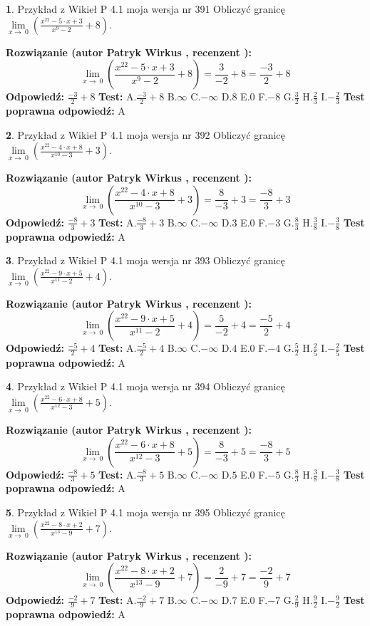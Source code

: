 \documentclass[12pt, a4paper]{article}
\theoremstyle{definition} %
\newtheorem{zad}{}
\newcommand{\zadStart}[1]{\begin{zad}#1\newline}
\newcommand{\zadStop}{\end{zad}}
\newcommand{\rozwStart}[2]{\noindent \textbf{Rozwiązanie (autor #1 , recenzent #2): }\newline}
\newcommand{\rozwStop}{\newline}
\newcommand{\odpStart}{\noindent \textbf{Odpowiedź:}\newline}
\newcommand{\odpStop}{\newline}
\newcommand{\testStart}{\noindent \textbf{Test:}\newline}
\newcommand{\testStop}{\newline}
\newcommand{\kluczStart}{\noindent \textbf{Test poprawna odpowiedź:}\newline}
\newcommand{\kluczStop}{\newline}
\begin{document}
\zadStart{Przykład z Wikieł P 4.1 moja wersja nr 391}
Obliczyć granicę $\lim\limits_{x\to\ 0}(\frac{x^{22}-5 \cdot x +3}{x^{9}-2}+8)$.
\zadStop
\rozwStart{Patryk Wirkus}{}
$$\lim\limits_{x\to\ 0}(\frac{x^{22}-5 \cdot x +3}{x^{9}-2}+8)=\frac{3}{-2}+8=\frac{-3}{2}+8$$
\rozwStop
\odpStart
$\frac{-3}{2}+8$
\odpStop
\testStart
A.$\frac{-3}{2}+8$
B.$\infty$
C.$-\infty$
D.$8$
E.$0$
F.$-8$
G.$\frac{3}{2}$
H.$\frac{2}{3}$
I.$-\frac{2}{3}$
\testStop
\kluczStart
A
\kluczStop



\zadStart{Przykład z Wikieł P 4.1 moja wersja nr 392}
Obliczyć granicę $\lim\limits_{x\to\ 0}(\frac{x^{22}-4 \cdot x +8}{x^{10}-3}+3)$.
\zadStop
\rozwStart{Patryk Wirkus}{}
$$\lim\limits_{x\to\ 0}(\frac{x^{22}-4 \cdot x +8}{x^{10}-3}+3)=\frac{8}{-3}+3=\frac{-8}{3}+3$$
\rozwStop
\odpStart
$\frac{-8}{3}+3$
\odpStop
\testStart
A.$\frac{-8}{3}+3$
B.$\infty$
C.$-\infty$
D.$3$
E.$0$
F.$-3$
G.$\frac{8}{3}$
H.$\frac{3}{8}$
I.$-\frac{3}{8}$
\testStop
\kluczStart
A
\kluczStop



\zadStart{Przykład z Wikieł P 4.1 moja wersja nr 393}
Obliczyć granicę $\lim\limits_{x\to\ 0}(\frac{x^{22}-9 \cdot x +5}{x^{11}-2}+4)$.
\zadStop
\rozwStart{Patryk Wirkus}{}
$$\lim\limits_{x\to\ 0}(\frac{x^{22}-9 \cdot x +5}{x^{11}-2}+4)=\frac{5}{-2}+4=\frac{-5}{2}+4$$
\rozwStop
\odpStart
$\frac{-5}{2}+4$
\odpStop
\testStart
A.$\frac{-5}{2}+4$
B.$\infty$
C.$-\infty$
D.$4$
E.$0$
F.$-4$
G.$\frac{5}{2}$
H.$\frac{2}{5}$
I.$-\frac{2}{5}$
\testStop
\kluczStart
A
\kluczStop



\zadStart{Przykład z Wikieł P 4.1 moja wersja nr 394}
Obliczyć granicę $\lim\limits_{x\to\ 0}(\frac{x^{22}-6 \cdot x +8}{x^{12}-3}+5)$.
\zadStop
\rozwStart{Patryk Wirkus}{}
$$\lim\limits_{x\to\ 0}(\frac{x^{22}-6 \cdot x +8}{x^{12}-3}+5)=\frac{8}{-3}+5=\frac{-8}{3}+5$$
\rozwStop
\odpStart
$\frac{-8}{3}+5$
\odpStop
\testStart
A.$\frac{-8}{3}+5$
B.$\infty$
C.$-\infty$
D.$5$
E.$0$
F.$-5$
G.$\frac{8}{3}$
H.$\frac{3}{8}$
I.$-\frac{3}{8}$
\testStop
\kluczStart
A
\kluczStop



\zadStart{Przykład z Wikieł P 4.1 moja wersja nr 395}
Obliczyć granicę $\lim\limits_{x\to\ 0}(\frac{x^{22}-8 \cdot x +2}{x^{13}-9}+7)$.
\zadStop
\rozwStart{Patryk Wirkus}{}
$$\lim\limits_{x\to\ 0}(\frac{x^{22}-8 \cdot x +2}{x^{13}-9}+7)=\frac{2}{-9}+7=\frac{-2}{9}+7$$
\rozwStop
\odpStart
$\frac{-2}{9}+7$
\odpStop
\testStart
A.$\frac{-2}{9}+7$
B.$\infty$
C.$-\infty$
D.$7$
E.$0$
F.$-7$
G.$\frac{2}{9}$
H.$\frac{9}{2}$
I.$-\frac{9}{2}$
\testStop
\kluczStart
A
\kluczStop
\end{document}
